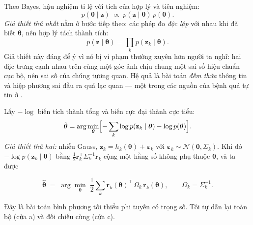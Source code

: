 \documentclass[../../vslam.tex]{subfiles}
\begin{document}
Theo Bayes, hậu nghiệm tỉ lệ với tích của hợp lý và tiên nghiệm:
\[
p(\boldsymbol{\theta} \mid \mathbf{z}) \;\propto\; p(\mathbf{z} \mid \boldsymbol{\theta})\, p(\boldsymbol{\theta}).
\]
\emph{Giả thiết thứ nhất} nằm ở bước tiếp theo: các phép đo \emph{độc lập} với nhau khi đã biết \(\boldsymbol{\theta}\), nên hợp lý tách thành tích:
\[
p(\mathbf{z}\mid\boldsymbol{\theta}) = \prod_k p(\mathbf{z}_k \mid \boldsymbol{\theta}).
\]
Giả thiết này đáng để ý vì nó bị vi phạm thường xuyên hơn người ta nghĩ: hai đặc trưng cạnh nhau trên cùng một góc ảnh chịu chung một sai số hiệu chuẩn cục bộ, nên sai số của chúng tương quan. Hệ quả là bài toán \emph{đếm thừa} thông tin và hiệp phương sai đầu ra quá lạc quan --- một trong các nguồn của bệnh quá tự tin ở .

Lấy \(-\log\) biến tích thành tổng và biến cực đại thành cực tiểu:
\[
\hat{\boldsymbol{\theta}} = \arg\min_{\boldsymbol{\theta}} \Bigl[ -\sum_k \log p(\mathbf{z}_k\mid\boldsymbol{\theta}) - \log p(\boldsymbol{\theta}) \Bigr].
\]
\emph{Giả thiết thứ hai:} nhiễu Gauss, \(\mathbf{z}_k = h_k(\boldsymbol{\theta}) + \boldsymbol{\varepsilon}_k\) với \(\boldsymbol{\varepsilon}_k \sim \mathcal{N}(\mathbf{0},\Sigma_k)\). Khi đó \(-\log p(\mathbf{z}_k\mid\boldsymbol{\theta})\) bằng \(\frac12 \mathbf{r}_k^{\top}\Sigma_k^{-1}\mathbf{r}_k\) cộng một hằng số không phụ thuộc \(\boldsymbol{\theta}\), và ta được

\begin{equation}
\hat{\boldsymbol{\theta}} \;=\; \arg\min_{\boldsymbol{\theta}}\; \frac{1}{2}\sum_k \mathbf{r}_k(\boldsymbol{\theta})^{\top}\,\Omega_k\, \mathbf{r}_k(\boldsymbol{\theta}),
\qquad \Omega_k = \Sigma_k^{-1}.
\label{eq:a04-nls}
\end{equation}

Đây là bài toán bình phương tối thiểu phi tuyến có trọng số. Tôi tự dẫn lại toàn bộ (cửa a) và đối chiếu \cite[§4]{barfoot2017} cùng \cite[§11]{thrun2005} (cửa c).
\end{document}
